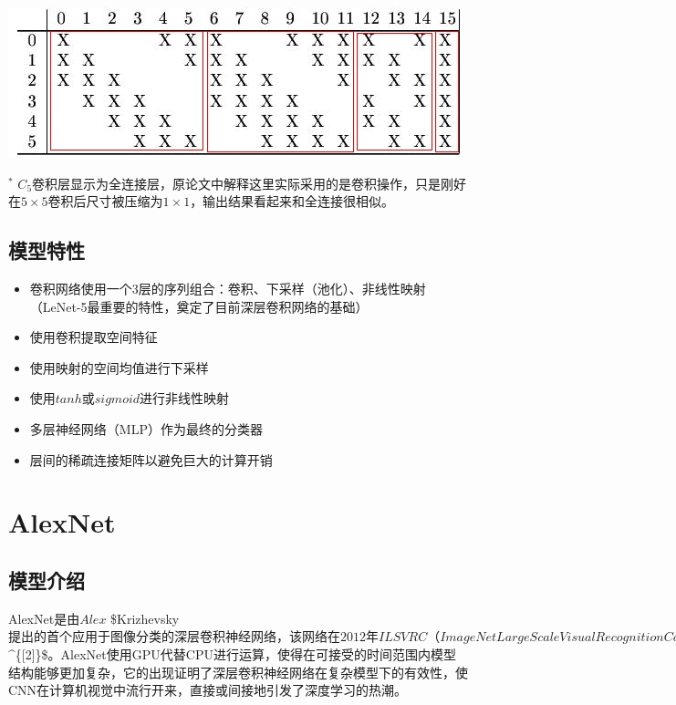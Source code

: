 \documentclass[12pt,a4paper,UTF8,twoside]{book}
\providecommand{\tightlist}{%
  \setlength{\itemsep}{0pt}\setlength{\parskip}{0pt}}
\begin{document}
\begin{center}\includegraphics[width=0.7\linewidth]{img/02-02} \end{center}

\(^*\) \(C_5\)卷积层显示为全连接层，原论文中解释这里实际采用的是卷积操作，只是刚好在\(5\times5\)卷积后尺寸被压缩为\(1\times1\)，输出结果看起来和全连接很相似。

\hypertarget{ux6a21ux578bux7279ux6027}{%
\subsection{模型特性}\label{ux6a21ux578bux7279ux6027}}

\begin{itemize}
\tightlist
\item
  卷积网络使用一个3层的序列组合：卷积、下采样（池化）、非线性映射（LeNet-5最重要的特性，奠定了目前深层卷积网络的基础）
\item
  使用卷积提取空间特征
\item
  使用映射的空间均值进行下采样
\item
  使用\(tanh\)或\(sigmoid\)进行非线性映射
\item
  多层神经网络（MLP）作为最终的分类器
\item
  层间的稀疏连接矩阵以避免巨大的计算开销
\end{itemize}

\hypertarget{alexnet}{%
\section{AlexNet}\label{alexnet}}

\hypertarget{ux6a21ux578bux4ecbux7ecd-1}{%
\subsection{模型介绍}\label{ux6a21ux578bux4ecbux7ecd-1}}

AlexNet是由\(Alex\) \$Krizhevsky \(提出的首个应用于图像分类的深层卷积神经网络，该网络在2012年ILSVRC（ImageNet Large Scale Visual Recognition Competition）图像分类竞赛中以15.3%
\)\^{}\{{[}2{]}\}\$。AlexNet使用GPU代替CPU进行运算，使得在可接受的时间范围内模型结构能够更加复杂，它的出现证明了深层卷积神经网络在复杂模型下的有效性，使CNN在计算机视觉中流行开来，直接或间接地引发了深度学习的热潮。
\end{document}

